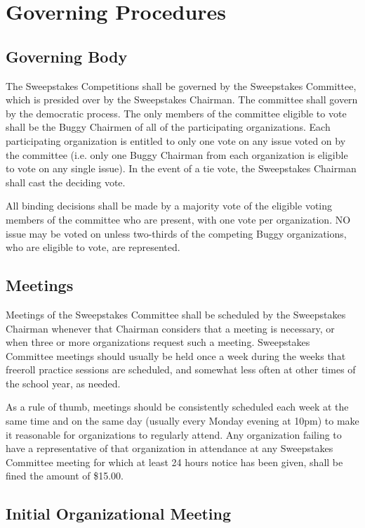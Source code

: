 \documentclass[openany]{book}
\begin{document}
\section{Governing Procedures}

\subsection{Governing Body}

The Sweepstakes Competitions shall be governed by the Sweepstakes Committee, which is presided over by the Sweepstakes Chairman. The committee shall govern by the democratic process. The only members of the committee eligible to vote shall be the Buggy Chairmen of all of the participating organizations. Each participating organization is entitled to only one vote on any issue voted on by the committee (i.e. only one Buggy Chairman from each organization is eligible to vote on any single issue). In the event of a tie vote, the Sweepstakes Chairman shall cast the deciding vote.

All binding decisions shall be made by a majority vote of the eligible voting members of the committee who are present, with one vote per organization. NO issue may be voted on unless two-thirds of the competing Buggy organizations, who are eligible to vote, are represented.

\subsection{Meetings}

Meetings of the Sweepstakes Committee shall be scheduled by the Sweepstakes Chairman whenever that Chairman considers that a meeting is necessary, or when three or more organizations request such a meeting. Sweepstakes Committee meetings should usually be held once a week during the weeks that freeroll practice sessions are scheduled, and somewhat less often at other times of the school year, as needed.

As a rule of thumb, meetings should be consistently scheduled each week at the same time and on the same day (usually every Monday evening at 10pm) to make it reasonable for organizations to regularly attend. Any organization failing to have a representative of that organization in attendance at any Sweepstakes Committee meeting for which at least 24 hours notice has been given, shall be fined the amount of \$15.00.

\subsection{Initial Organizational Meeting}
\end{document}
